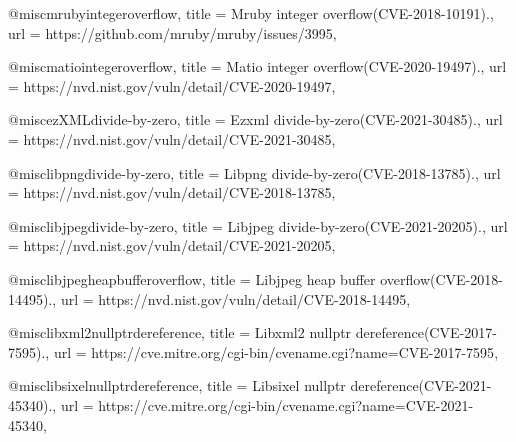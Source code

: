         @misc{mrubyintegeroverflow,
          title = {Mruby integer overflow(CVE-2018-10191).},
          url = {https://github.com/mruby/mruby/issues/3995},
        }
        
        @misc{matiointegeroverflow,
          title = {Matio integer overflow(CVE-2020-19497).},
          url = {https://nvd.nist.gov/vuln/detail/CVE-2020-19497},
        }
        
        @misc{ezXMLdivide-by-zero,
          title = {Ezxml divide-by-zero(CVE-2021-30485).},
          url = {https://nvd.nist.gov/vuln/detail/CVE-2021-30485},
        }
        
        @misc{libpngdivide-by-zero,
          title = {Libpng divide-by-zero(CVE-2018-13785).},
          url = {https://nvd.nist.gov/vuln/detail/CVE-2018-13785},
        }
        
        @misc{libjpegdivide-by-zero,
          title = {Libjpeg divide-by-zero(CVE-2021-20205).},
          url = {https://nvd.nist.gov/vuln/detail/CVE-2021-20205},
        }
        
        @misc{libjpegheapbufferoverflow,
          title = {Libjpeg heap buffer overflow(CVE-2018-14495).},
          url = {https://nvd.nist.gov/vuln/detail/CVE-2018-14495},
        }
        
        @misc{libxml2nullptrdereference,
          title = {Libxml2 nullptr dereference(CVE-2017-7595).},
          url = {https://cve.mitre.org/cgi-bin/cvename.cgi?name=CVE-2017-7595},
        }
        
        @misc{libsixelnullptrdereference,
          title = {Libsixel nullptr dereference(CVE-2021-45340).},
          url = {https://cve.mitre.org/cgi-bin/cvename.cgi?name=CVE-2021-45340},
        }
        

